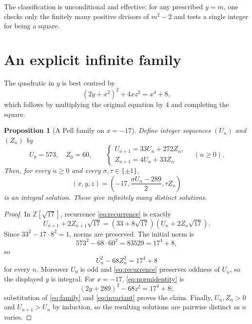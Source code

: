 \documentclass[11pt]{article}
\newtheorem{proposition}[theorem]{Proposition}
\theoremstyle{remark}
\begin{document}
The classification is unconditional and effective: for any prescribed $y=m$,
one checks only the finitely many positive divisors of $m^2-2$ and tests a
single integer for being a square.

\section{An explicit infinite family}

The quadratic in $y$ is best centred by
\begin{equation}\label{eq:normidentity}
 (2y+x^2)^2+4xz^2=x^4+8,
\end{equation}
which follows by multiplying the original equation by $4$ and completing the
square.

\begin{proposition}[A Pell family on $x=-17$]\label{prop:family}
Define integer sequences $(U_n)$ and $(Z_n)$ by
\begin{equation}\label{eq:recurrence}
 U_0=573,\quad Z_0=60,\qquad
 \begin{cases}
 U_{n+1}=33U_n+272Z_n,\\
 Z_{n+1}=4U_n+33Z_n
 \end{cases}
 \quad(n\ge0).
\end{equation}
Then, for every $n\ge0$ and every $\sigma,\tau\in\{\pm1\}$,
\begin{equation}\label{eq:family}
 \boxed{
 (x,y,z)=
 \left(-17,\frac{\sigma U_n-289}{2},\tau Z_n\right)
 }
\end{equation}
is an integral solution.  These give infinitely many distinct solutions.
\end{proposition}

\begin{proof}
In $\mathbb Z[\sqrt{17}]$, recurrence \eqref{eq:recurrence} is exactly
\[
 U_{n+1}+2Z_{n+1}\sqrt{17}
 =(33+8\sqrt{17})(U_n+2Z_n\sqrt{17}).
\]
Since $33^2-17\cdot8^2=1$, norms are preserved.  The initial norm is
\[
 573^2-68\cdot60^2=83529=17^4+8,
\]
so
\begin{equation}\label{eq:invariant}
 U_n^2-68Z_n^2=17^4+8
\end{equation}
for every $n$.  Moreover $U_0$ is odd and \eqref{eq:recurrence} preserves
oddness of $U_n$, so the displayed $y$ is integral.  For $x=-17$,
\eqref{eq:normidentity} is
\[
 (2y+289)^2-68z^2=17^4+8;
\]
substitution of \eqref{eq:family} and \eqref{eq:invariant} proves the claim.
Finally, $U_n,Z_n>0$ and $U_{n+1}>U_n$ by induction, so the resulting
solutions are pairwise distinct as $n$ varies.
\end{proof}
\end{document}
